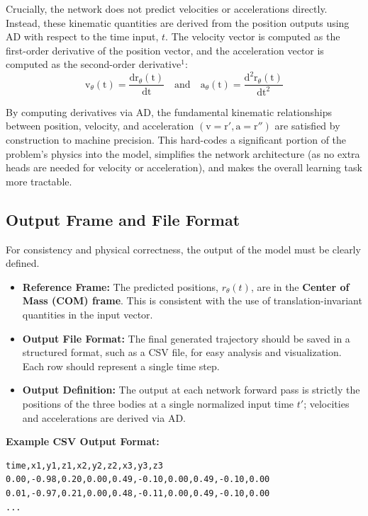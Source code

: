 \documentclass{article}
\begin{document}
Crucially, the network does not predict velocities or accelerations directly. Instead, these kinematic quantities are derived from the position outputs using AD with respect to the time input, $t$. The velocity vector is computed as the first-order derivative of the position vector, and the acceleration vector is computed as the second-order derivative$^1$:
\[
\mathrm{v}_\theta(\mathrm{t}) = \frac{\mathrm{d} \mathrm{r}_\theta(\mathrm{t})}{\mathrm{d} \mathrm{t}} \quad \text{and} \quad \mathrm{a}_\theta(\mathrm{t}) = \frac{\mathrm{d}^2 \mathrm{r}_\theta(\mathrm{t})}{\mathrm{d} \mathrm{t}^2}
\]

By computing derivatives via AD, the fundamental kinematic relationships between position, velocity, and acceleration $(\mathrm{v} = \mathrm{r}', \mathrm{a} = \mathrm{r}'')$ are satisfied by construction to machine precision. This hard-codes a significant portion of the problem's physics into the model, simplifies the network architecture (as no extra heads are needed for velocity or acceleration), and makes the overall learning task more tractable.






\subsection{Output Frame and File Format}
For consistency and physical correctness, the output of the model must be clearly defined.
\begin{itemize}
    \item \textbf{Reference Frame:} The predicted positions, $r_{\theta}(t)$, are in the \textbf{Center of Mass (COM) frame}. This is consistent with the use of translation-invariant quantities in the input vector.
    \item \textbf{Output File Format:} The final generated trajectory should be saved in a structured format, such as a CSV file, for easy analysis and visualization. Each row should represent a single time step.
    \item \textbf{Output Definition:} The output at each network forward pass is strictly the positions of the three bodies at a single normalized input time $t'$;
    velocities and accelerations are derived via AD.
\end{itemize}

\textbf{Example CSV Output Format:}
\begin{verbatim}
time,x1,y1,z1,x2,y2,z2,x3,y3,z3
0.00,-0.98,0.20,0.00,0.49,-0.10,0.00,0.49,-0.10,0.00
0.01,-0.97,0.21,0.00,0.48,-0.11,0.00,0.49,-0.10,0.00
...
\end{verbatim}
\end{document}
